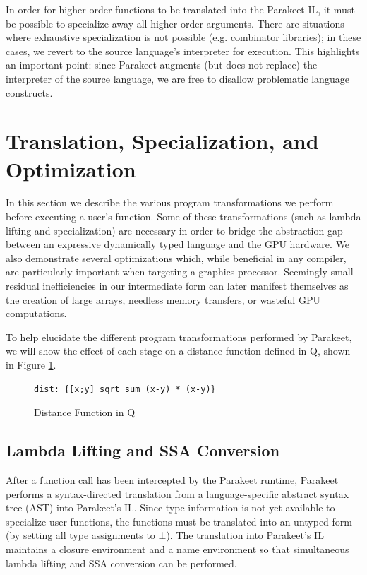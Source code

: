 \documentclass[preprint]{sigplanconf}
\begin{document}
In order for higher-order functions to be translated into the Parakeet IL, it must be possible to specialize away all higher-order arguments. There are situations where exhaustive specialization is not possible (e.g. combinator libraries); in these cases, we revert to the source language's interpreter for
execution. This highlights an important point: since Parakeet augments (but does not replace) the interpreter of the source language, we are free to disallow problematic language constructs.

\section{Translation, Specialization, and Optimization}
\label{Compilation}
In this section we describe the various program transformations we perform before executing a user's function. Some of these transformations (such as lambda lifting and specialization) are necessary in order to bridge the abstraction gap between an expressive dynamically typed language and the GPU hardware. We also demonstrate several optimizations which, while beneficial in any compiler, are particularly important when targeting a graphics processor. Seemingly small residual inefficiencies in our intermediate form can later manifest themselves as the creation of large arrays, needless memory transfers, or wasteful GPU computations.

To help elucidate the different program transformations performed by Parakeet, we will show the effect of each stage on a distance function defined in Q, shown in Figure \ref{QDist}.

\begin{figure}[h!]
    \begin{lstlisting}[numbers=none]
    dist: {[x;y] sqrt sum (x-y) * (x-y)}
    \end{lstlisting}
    \caption{Distance Function in Q}
    \label{QDist}
\end{figure}

\subsection{Lambda Lifting and SSA Conversion}
After a function call has been intercepted by the Parakeet runtime, Parakeet performs a syntax-directed translation from a language-specific abstract syntax tree (AST) into Parakeet's IL. Since type information is not yet available to specialize user functions, the functions must be translated into an untyped
form (by setting all type assignments to $\bot$). The translation into Parakeet's IL maintains a closure environment and a name environment so that simultaneous lambda lifting and SSA conversion can be performed.
\end{document}
